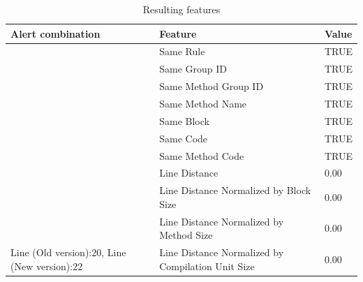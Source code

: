\documentclass[
]{article}
\begin{document}
\small

\begin{table}[!h]

\caption{\label{tab:unnamed-chunk-5}Resulting features\label{table_features} }
\centering
\begin{tabular}[t]{l|l|l}
\hline
Alert combination & Feature & Value\\
\hline
\rowcolor{gray!6}   & Same Rule & TRUE\\

 & Same Group ID & TRUE\\

\rowcolor{gray!6}   & Same Method Group ID & TRUE\\

 & Same Method Name & TRUE\\

\rowcolor{gray!6}   & Same Block & TRUE\\

 & Same Code & TRUE\\

\rowcolor{gray!6}   & Same Method Code & TRUE\\

 & Line Distance & 0.00\\

\rowcolor{gray!6}   & Line Distance Normalized by Block Size & 0.00\\

 & Line Distance Normalized by Method Size & 0.00\\

\multirow[t]{-11}{*}{\raggedright\arraybackslash Line (Old version):20, Line (New version):22} & Line Distance Normalized by Compilation Unit Size & 0.00\\
\hline
\end{tabular}
\end{table}

\normalsize

\small

\normalsize

\newpage
\end{document}
